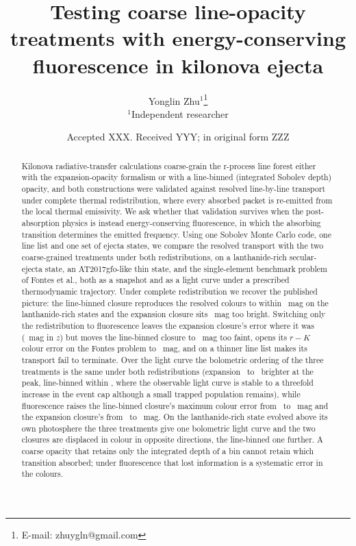 \documentclass[fleqn,usenatbib]{mnras}
\title[Fluorescence and coarse line opacity in kilonovae]{Testing coarse line-opacity treatments with energy-conserving fluorescence in kilonova ejecta}
\author[Y. Zhu]{Yonglin Zhu$^{1}$\thanks{E-mail: zhuygln@gmail.com}\\
$^{1}$Independent researcher}
\date{Accepted XXX. Received YYY; in original form ZZZ}
\begin{document}
\label{firstpage}
\pagerange{\pageref{firstpage}--\pageref{lastpage}}
\maketitle

\begin{abstract}
Kilonova radiative-transfer calculations coarse-grain the r-process line forest either with the expansion-opacity formalism or with a line-binned (integrated Sobolev depth) opacity, and both constructions were validated against resolved line-by-line transport under complete thermal redistribution, where every absorbed packet is re-emitted from the local thermal emissivity. We ask whether that validation survives when the post-absorption physics is instead energy-conserving fluorescence, in which the absorbing transition determines the emitted frequency. Using one Sobolev Monte Carlo code, one line list and one set of ejecta states, we compare the resolved transport with the two coarse-grained treatments under both redistributions, on a lanthanide-rich secular-ejecta state, an AT2017gfo-like thin state, and the single-element benchmark problem of Fontes et al., both as a snapshot and as a light curve under a prescribed thermodynamic trajectory. Under complete redistribution we recover the published picture: the line-binned closure reproduces the resolved colours to within \BbinthRthPoneAbsmax\ mag on the lanthanide-rich states and the expansion closure sits \BthRthPone\ mag too bright. Switching only the redistribution to fluorescence leaves the expansion closure's error where it was (\BtwoRtwoZPone\ mag in $z$) but moves the line-binned closure to \BbinRtwoPone\ mag too faint, opens its $r-K$ colour error on the Fontes problem to \FontesFluBbinRtwoRK\ mag, and on a thinner line list makes its transport fail to terminate. Over the light curve the bolometric ordering of the three treatments is the same under both redistributions (expansion \LcBthDL\ to \LcBtwoDL\ brighter at the peak, line-binned within \LcBbintwoDL, where the observable light curve is stable to a threefold increase in the event cap although a small trapped population remains), while fluorescence raises the line-binned closure's maximum colour error from \LcBbinthColour\ to \LcBbintwoColour\ mag and the expansion closure's from \LcBthColour\ to \LcBtwoColour\ mag. On the lanthanide-rich state evolved above its own photosphere the three treatments give one bolometric light curve and the two closures are displaced in colour in opposite directions, the line-binned one further. A coarse opacity that retains only the integrated depth of a bin cannot retain which transition absorbed; under fluorescence that lost information is a systematic error in the colours.
\end{abstract}
\end{document}
